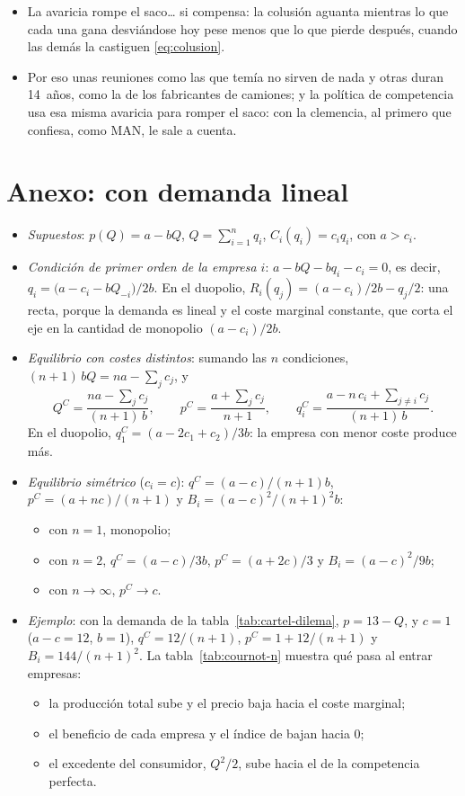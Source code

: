 \documentclass[11pt]{article}
\begin{document}
\begin{itemize}
\begin{itemize}
  \item La avaricia rompe el saco\ldots{} si compensa: la colusión aguanta mientras lo que cada una gana desviándose hoy pese menos que lo que pierde después, cuando las demás la castiguen \eqref{eq:colusion}.

  \item Por eso unas reuniones como las que temía  no sirven de nada y otras duran 14~años, como la de los fabricantes de camiones; y la política de competencia usa esa misma avaricia para romper el saco: con la clemencia, al primero que confiesa, como MAN, le sale a cuenta.
  \end{itemize}
\end{itemize}

\clearpage
\appendix

\section{Anexo:  con demanda lineal}\label{anexo:cournot-lineal}

\begin{itemize}
\item \emph{Supuestos}: $p(Q)=a-bQ$, $Q=\sum_{i=1}^nq_i$, $C_i(q_i)=c_iq_i$, con $a>c_i$.
\item \emph{Condición de primer orden de la empresa $i$}: $a-bQ-bq_i-c_i=0$, es decir, $q_i=\big(a-c_i-bQ_{-i}\big)/2b$. En el duopolio, $R_i(q_j)=(a-c_i)/2b-q_j/2$: una recta, porque la demanda es lineal y el coste marginal constante, que corta el eje en la cantidad de monopolio $(a-c_i)/2b$.
\item \emph{Equilibrio con costes distintos}: sumando las $n$ condiciones, $(n+1)\,bQ=na-\sum_jc_j$, y
  \[
  Q^C=\frac{na-\sum_jc_j}{(n+1)\,b},\qquad p^C=\frac{a+\sum_jc_j}{n+1},\qquad q_i^C=\frac{a-n\,c_i+\sum_{j\neq i}c_j}{(n+1)\,b}.
  \]
  En el duopolio, $q_1^C=(a-2c_1+c_2)/3b$: la empresa con menor coste produce más.
\item \emph{Equilibrio simétrico} ($c_i=c$): $q^C=(a-c)/(n+1)b$, $p^C=(a+nc)/(n+1)$ y $B_i=(a-c)^2/(n+1)^2b$:
  \begin{itemize}
  \item con $n=1$, monopolio;
  \item con $n=2$, $q^C=(a-c)/3b$, $p^C=(a+2c)/3$ y $B_i=(a-c)^2/9b$;
  \item con $n\to\infty$, $p^C\to c$.
  \end{itemize}
\item \emph{Ejemplo}: con la demanda de la tabla~\ref{tab:cartel-dilema}, $p=13-Q$, y $c=1$ ($a-c=12$, $b=1$), $q^C=12/(n+1)$, $p^C=1+12/(n+1)$ y $B_i=144/(n+1)^2$. La tabla~\ref{tab:cournot-n} muestra qué pasa al entrar empresas:
  \begin{itemize}
  \item la producción total sube y el precio baja hacia el coste marginal;
  \item el beneficio de cada empresa y el índice de  bajan hacia 0;
  \item el excedente del consumidor, $Q^2/2$, sube hacia el de la competencia perfecta.
  \end{itemize}
\end{itemize}
\end{document}
